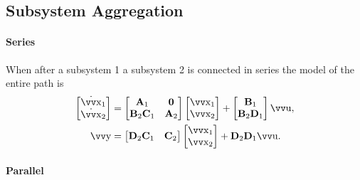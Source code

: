 \subsection{Subsystem Aggregation}

\paragraph{Series}

When after a subsystem 1 a subsystem 2 is connected in series the model of the entire path is
\begin{align*}
	\begin{bmatrix}
		\dot{\vec{x}}_1 \\ \dot{\vec{x}}_2
	\end{bmatrix}
	&=
	\begin{bmatrix}
			\mx{A}_1 & \mx{0} \\
			\mx{B}_2 \mx{C}_1 & \mx{A}_2 
	\end{bmatrix}
	\begin{bmatrix}
		\vec{x}_1 \\ \vec{x}_2
	\end{bmatrix}
	+
	\begin{bmatrix}
		\mx{B}_1 \\ \mx{B}_2 \mx{D}_1
	\end{bmatrix}
	\vec{u},
	\\
	\vec{y}
	&=
	\begin{bmatrix}
		\mx{D}_2 \mx{C}_1 & \mx{C}_2
	\end{bmatrix}
	\begin{bmatrix}
		\vec{x}_1 \\ \vec{x}_2
	\end{bmatrix}
	+
	\mx{D}_2 \mx{D}_1 \vec{u}.
\end{align*}

\paragraph{Parallel}

